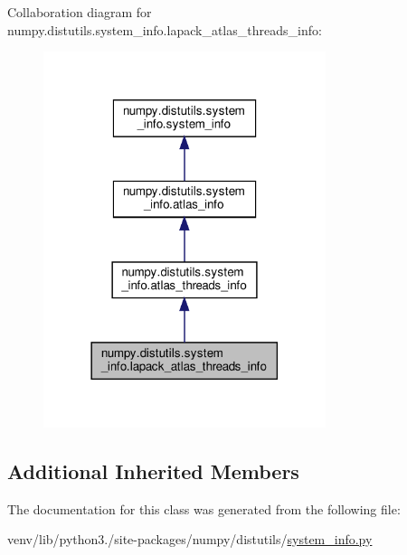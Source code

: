 Collaboration diagram for numpy.\+distutils.\+system\+\_\+info.\+lapack\+\_\+atlas\+\_\+threads\+\_\+info\+:
\nopagebreak
\begin{figure}[H]
\begin{center}
\leavevmode
\includegraphics[width=234pt]{classnumpy_1_1distutils_1_1system__info_1_1lapack__atlas__threads__info__coll__graph}
\end{center}
\end{figure}
\subsection*{Additional Inherited Members}


The documentation for this class was generated from the following file\+:\begin{DoxyCompactItemize}
\item 
venv/lib/python3./site-\/packages/numpy/distutils/\hyperlink{system__info_8py}{system\+\_\+info.\+py}\end{DoxyCompactItemize}
